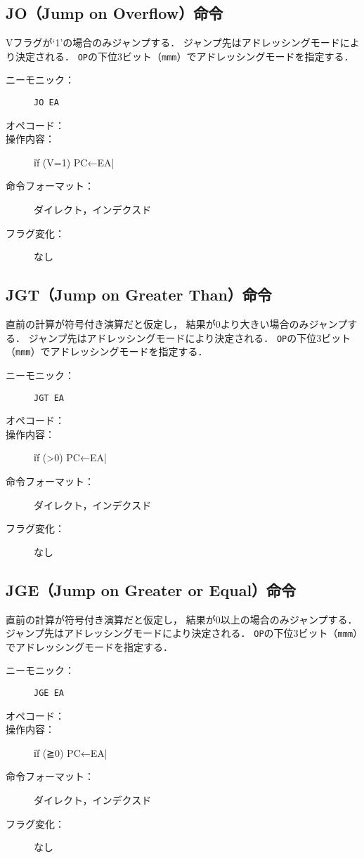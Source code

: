 \subsection{JO（Jump on Overflow）命令}
Vフラグが`1'の場合のみジャンプする．
ジャンプ先はアドレッシングモードにより決定される．
\texttt{OP}の下位3ビット（\texttt{mmm}）でアドレッシングモードを指定する．

\begin{description}
\item[ニーモニック：] \texttt{JO EA}
\item[オペコード：] 
\item[操作内容：] \|if (V=1) PC←EA|
\item[命令フォーマット：] ダイレクト，インデクスド
\item[フラグ変化：] なし
\end{description}

\subsection{JGT（Jump on Greater Than）命令}
直前の計算が符号付き演算だと仮定し，
結果が0より大きい場合のみジャンプする．
ジャンプ先はアドレッシングモードにより決定される．
\texttt{OP}の下位3ビット（\texttt{mmm}）でアドレッシングモードを指定する．

\begin{description}
\item[ニーモニック：] \texttt{JGT EA}
\item[オペコード：] 
\item[操作内容：] \|if (>0) PC←EA|
\item[命令フォーマット：] ダイレクト，インデクスド
\item[フラグ変化：] なし
\end{description}

\subsection{JGE（Jump on Greater or Equal）命令}
直前の計算が符号付き演算だと仮定し，
結果が0以上の場合のみジャンプする．
ジャンプ先はアドレッシングモードにより決定される．
\texttt{OP}の下位3ビット（\texttt{mmm}）でアドレッシングモードを指定する．

\begin{description}
\item[ニーモニック：] \texttt{JGE EA}
\item[オペコード：] 
\item[操作内容：] \|if (≧0) PC←EA|
\item[命令フォーマット：] ダイレクト，インデクスド
\item[フラグ変化：] なし
\end{description}

